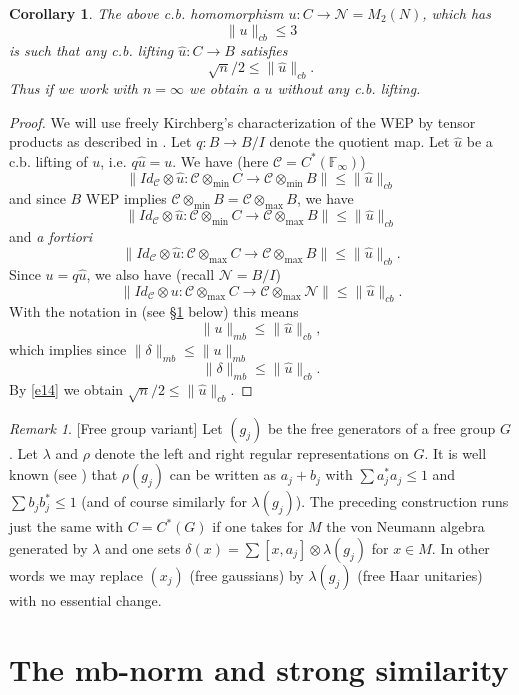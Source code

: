 \documentclass[11pt,leqno]{article}
\newcommand{\bb}[1]{\mathbb{#1}}
\newcommand{\cl}[1]{\mathcal{#1}}
\theoremstyle{plain}
\newtheorem{cor}[thm]{Corollary}
\theoremstyle{definition}
\theoremstyle{remark}
\newtheorem{rem}[thm]{Remark}
\numberwithin{equation}{section}
\def\C{\cl C}
\def\F{\bb F}
\def\d{\delta}
\def\F{\bb F}
\def\d{\delta}
\def\C{\mathscr{C}}
\begin{document}
    \begin{cor}\label{c1} The above c.b. homomorphism $u: C \to \cl N=M_2( N)$, which   
    has
    $$\|u\|_{cb} \le 3$$   is such that
    any c.b. lifting $\hat u: C \to B$ satisfies
    $$ \sqrt n/2\le \|\hat u\|_{cb} .$$
    Thus if we work with $n=\infty$ we obtain a $u$ without any c.b. lifting.
   \end{cor}
    \begin{proof} 
     We will use freely
    Kirchberg's characterization of the WEP by tensor products
    as described in \cite[\S 9.3]{154}. Let $q: B \to B/I$ denote the quotient map.
 Let  $\hat u$ be a c.b. lifting of $u$, i.e. $q\hat u=u$.
We have (here $\C=C^*(\F_\infty)$)
    $$\|Id_{\C} \otimes \hat u : \C \otimes_{\min} C  \to \C \otimes_{\min} B \|\le \|\hat u\|_{cb} $$
    and since $B$ WEP implies $\C \otimes_{\min} B=\C \otimes_{\max} B$,
    we   have
    $$\|Id_{\C} \otimes \hat u : \C \otimes_{\min} C  \to \C \otimes_{\max} B \|\le \|\hat u\|_{cb} $$
    and {\it a fortiori}
    $$\|Id_{\C} \otimes \hat u : \C \otimes_{\max} C  \to \C \otimes_{\max} B \|\le \|\hat u\|_{cb} .$$
    Since $u=q\hat u$, we also have (recall $\cl N  =B/I$) 
    $$\|Id_{\C} \otimes   u : \C \otimes_{\max} C  \to \C \otimes_{\max} {\cl N} \|\le \|\hat u\|_{cb} .$$
    With the notation in \cite{157} (see \S \ref{s2} below) this means
    $$\|  u\|_{mb} \le \|\hat u\|_{cb} ,$$
    which implies since $\|  \d\|_{mb} \le \|  u\|_{mb}$
        $$\|  \d\|_{mb} \le \|\hat u\|_{cb} .$$
    By \eqref{e14} we obtain $\sqrt n /2  \le \|\hat u\|_{cb} .$
 \end{proof}
    
    \begin{rem}\label{Z} [Free group variant] Let $(g_j)$ be the free generators of a free group $G$.
    Let $\lambda$ and $\rho$ denote the left and right regular representations on $G$.
    It is well known (see \cite{toho})  that $\rho(g_j)$  can be written as $a_j+b_j$ 
    with $\sum a_j^* a_j\le 1$ and $\sum b_j b_j^*\le 1$ (and of course similarly for $\lambda(g_j)$).
    The preceding construction    runs just the same with $C=C^*(G)$ if   one takes
     for $ M$ the von Neumann algebra 
    generated by $\lambda$ and one sets
    $\d(x)=\sum [x,a_j] \otimes \lambda(g_j) $ for $x\in M$. In other words we may replace 
    $(x_j)$ (free gaussians) by $\lambda(g_j)$ (free Haar unitaries) with no essential change.
    \end{rem}
    
    \section{The mb-norm and strong similarity}\label{s2}
    
\end{document}
